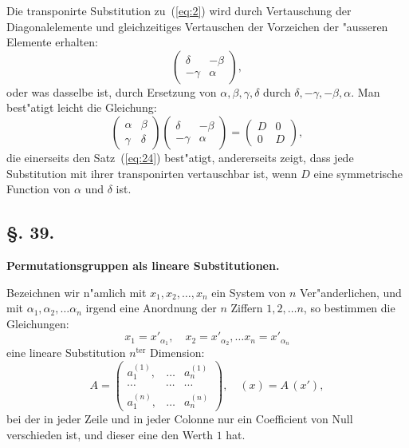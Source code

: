\documentclass[12pt,a4paper]{article}
\theoremstyle{weber}
\begin{document}
Die transponirte Substitution zu~(\ref{eq:2}) wird durch Vertauschung der Diagonalelemente und gleichzeitiges Vertauschen der Vorzeichen der "ausseren Elemente erhalten:
\begin{equation}\label{eq:6}
\begin{pmatrix}\delta & -\beta \\ -\gamma & \alpha\end{pmatrix},
\end{equation}
oder was dasselbe ist, durch Ersetzung von $\alpha, \beta, \gamma, \delta$ durch $\delta, -\gamma, -\beta, \alpha$. Man best"atigt leicht die Gleichung:
\begin{equation}\label{eq:7}
\begin{pmatrix}\alpha & \beta \\ \gamma & \delta\end{pmatrix}
\begin{pmatrix}\delta & -\beta \\ -\gamma & \alpha\end{pmatrix}
= \begin{pmatrix} D & 0 \\ 0 & D \end{pmatrix},
\end{equation}
die einerseits den Satz~(\ref{eq:24}) best"atigt, andererseits zeigt, dass jede Substitution mit ihrer transponirten vertauschbar ist, wenn $D$ eine symmetrische Function von $\alpha$ und $\delta$ ist.


\newpage
\subsection*{\S. 39.}

\begin{center}
\textbf{Permutationsgruppen als lineare Substitutionen.}
\end{center}

\bigskip

Bezeichnen wir n"amlich mit $x_1, x_2, \ldots, x_n$ ein System von $n$ Ver"anderlichen, und mit $\alpha_1, \alpha_2, \ldots \alpha_n$ irgend eine Anordnung der $n$ Ziffern $1, 2, \ldots n$, so bestimmen die Gleichungen:
\begin{equation}\label{eq:1}
x_1 = x'_{\alpha_1},\quad x_2 = x'_{\alpha_2}, \ldots x_n = x'_{\alpha_n}
\end{equation}
eine lineare Substitution $n^{\text{ter}}$ Dimension:
\begin{equation}\label{eq:2}
A = \begin{pmatrix}
a_1^{(1)}, & \ldots & a_n^{(1)} \\
\cdots & \cdots & \cdots \\
a_1^{(n)}, & \ldots & a_n^{(n)}
\end{pmatrix},\quad (x) = A\,(x'),
\end{equation}
bei der in jeder Zeile und in jeder Colonne nur ein Coefficient von Null verschieden ist, und dieser eine den Werth $1$ hat.
\end{document}
